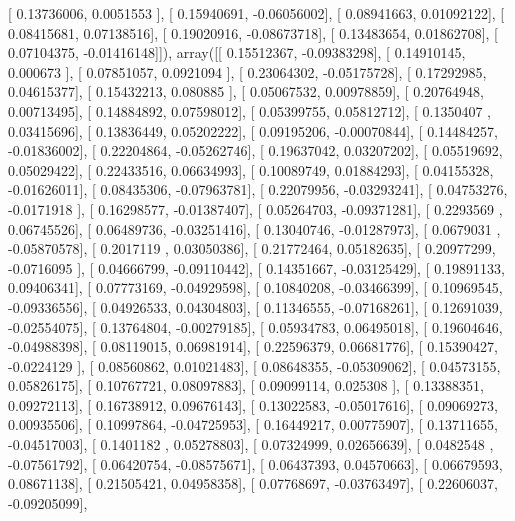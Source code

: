 \documentclass{article}
\begin{document}
       [ 0.13736006,  0.0051553 ],
       [ 0.15940691, -0.06056002],
       [ 0.08941663,  0.01092122],
       [ 0.08415681,  0.07138516],
       [ 0.19020916, -0.08673718],
       [ 0.13483654,  0.01862708],
       [ 0.07104375, -0.01416148]]), array([[ 0.15512367, -0.09383298],
       [ 0.14910145,  0.000673  ],
       [ 0.07851057,  0.0921094 ],
       [ 0.23064302, -0.05175728],
       [ 0.17292985,  0.04615377],
       [ 0.15432213,  0.080885  ],
       [ 0.05067532,  0.00978859],
       [ 0.20764948,  0.00713495],
       [ 0.14884892,  0.07598012],
       [ 0.05399755,  0.05812712],
       [ 0.1350407 ,  0.03415696],
       [ 0.13836449,  0.05202222],
       [ 0.09195206, -0.00070844],
       [ 0.14484257, -0.01836002],
       [ 0.22204864, -0.05262746],
       [ 0.19637042,  0.03207202],
       [ 0.05519692,  0.05029422],
       [ 0.22433516,  0.06634993],
       [ 0.10089749,  0.01884293],
       [ 0.04155328, -0.01626011],
       [ 0.08435306, -0.07963781],
       [ 0.22079956, -0.03293241],
       [ 0.04753276, -0.0171918 ],
       [ 0.16298577, -0.01387407],
       [ 0.05264703, -0.09371281],
       [ 0.2293569 ,  0.06745526],
       [ 0.06489736, -0.03251416],
       [ 0.13040746, -0.01287973],
       [ 0.0679031 , -0.05870578],
       [ 0.2017119 ,  0.03050386],
       [ 0.21772464,  0.05182635],
       [ 0.20977299, -0.0716095 ],
       [ 0.04666799, -0.09110442],
       [ 0.14351667, -0.03125429],
       [ 0.19891133,  0.09406341],
       [ 0.07773169, -0.04929598],
       [ 0.10840208, -0.03466399],
       [ 0.10969545, -0.09336556],
       [ 0.04926533,  0.04304803],
       [ 0.11346555, -0.07168261],
       [ 0.12691039, -0.02554075],
       [ 0.13764804, -0.00279185],
       [ 0.05934783,  0.06495018],
       [ 0.19604646, -0.04988398],
       [ 0.08119015,  0.06981914],
       [ 0.22596379,  0.06681776],
       [ 0.15390427, -0.0224129 ],
       [ 0.08560862,  0.01021483],
       [ 0.08648355, -0.05309062],
       [ 0.04573155,  0.05826175],
       [ 0.10767721,  0.08097883],
       [ 0.09099114,  0.025308  ],
       [ 0.13388351,  0.09272113],
       [ 0.16738912,  0.09676143],
       [ 0.13022583, -0.05017616],
       [ 0.09069273,  0.00935506],
       [ 0.10997864, -0.04725953],
       [ 0.16449217,  0.00775907],
       [ 0.13711655, -0.04517003],
       [ 0.1401182 ,  0.05278803],
       [ 0.07324999,  0.02656639],
       [ 0.0482548 , -0.07561792],
       [ 0.06420754, -0.08575671],
       [ 0.06437393,  0.04570663],
       [ 0.06679593,  0.08671138],
       [ 0.21505421,  0.04958358],
       [ 0.07768697, -0.03763497],
       [ 0.22606037, -0.09205099],
\end{document}
